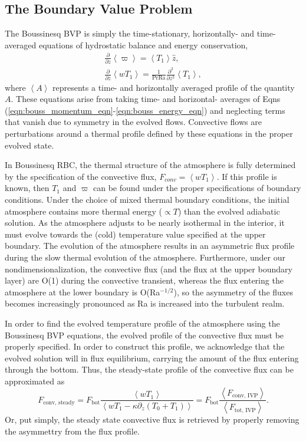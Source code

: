 \documentclass[aps, pre, onecolumn, nofootinbib, notitlepage, groupedaddress, amsfonts, amssymb, amsmath, longbibliography]{revtex4-1}
\newcommand{\angles}[1]{\ensuremath{\left\langle #1 \right\rangle}}
\begin{document}
\subsection{The Boundary Value Problem}
The Boussinesq BVP is simply the time-stationary, horizontally- and time- averaged equations
of hydrostatic balance and energy conservation,
\begin{gather}
\frac{\partial}{\partial z}\angles{\varpi} = \angles{T_1}\hat{z},
	\label{eqn:bouss_BVP_momentum}
\\
\frac{\partial}{\partial z}\angles{wT_1} = \frac{1}{\text{Pr}\text{Ra}}\frac{\partial^2}{\partial z^2} \angles{T_1},
	\label{eqn:bouss_BVP_energy}
\end{gather}
where $\angles{A}$ represents a time- and horizontally averaged profile of the quantity $A$.  These
equations arise from taking time- and horizontal- averages of Eqns (\ref{eqn:bouss_momentum_eqn}-\ref{eqn:bouss_energy_eqn})
and neglecting terms that vanish due to symmetry in the evolved flows.  Convective flows
are perturbations around a thermal profile defined by these equations in the proper evolved state.

In Boussinesq RBC, the thermal structure of the atmosphere is fully determined by the specification
of the convective flux, $F_{conv} = \angles{w T_1}$.  If this profile is known, then $T_1$ and
$\varpi$ can be found under the proper specifications of boundary conditions.  
Under the choice of mixed thermal boundary conditions, the initial
atmosphere contains more thermal energy ($\propto T$) than the 
evolved adiabatic solution.  As the atmosphere adjusts to be nearly isothermal in the interior,
it must evolve towards the (cold) temperature value specified at the upper boundary.
The evolution of the atmosphere results in an asymmetric flux profile during 
the slow thermal evolution of the atmosphere.  Furthermore, under our nondimensionalization,
the convective flux (and the flux at the upper boundary layer) are O(1) during the convective
transient, whereas the flux entering the atmosphere at the lower boundary is O(Ra$^{-1/2}$), so the asymmetry of the fluxes
becomes increasingly pronounced as Ra is increased into the turbulent realm. 

In order to find the evolved temperature profile of the atmosphere using the Boussinesq BVP equations, 
the evolved profile of the convective flux must be properly specified.  In order to construct
this profile, we acknowledge that the evolved solution will in flux equilibrium, 
carrying the amount of the flux entering through the bottom.  
Thus, the steady-state profile of the convective flux can be approximated as
\begin{equation}
F_{\text{conv, steady}} = F_{\text{bot}}\frac{\angles{wT_1}}{\angles{wT_1 - \kappa \partial_z (T_0 + T_1)}}
= F_{\text{bot}}\frac{\angles{F_{\text{conv, IVP}}}}{\angles{F_{\text{tot, IVP}}}}.
\label{eqn:bouss_BVP_fconv}
\end{equation}
Or, put simply, the steady state convective flux is retrieved by properly removing the asymmettry
from the flux profile.
\end{document}
